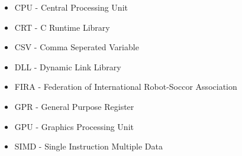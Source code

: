 \begin{itemize}
  \item CPU - Central Processing Unit
  \item CRT - C Runtime Library
  \item CSV - Comma Seperated Variable
  \item DLL - Dynamic Link Library
  \item FIRA - Federation of International Robot-Soccor Association
  \item GPR - General Purpose Register
  \item GPU - Graphics Processing Unit
  \item SIMD - Single Instruction Multiple Data
\end{itemize}



\cleardoublepage

